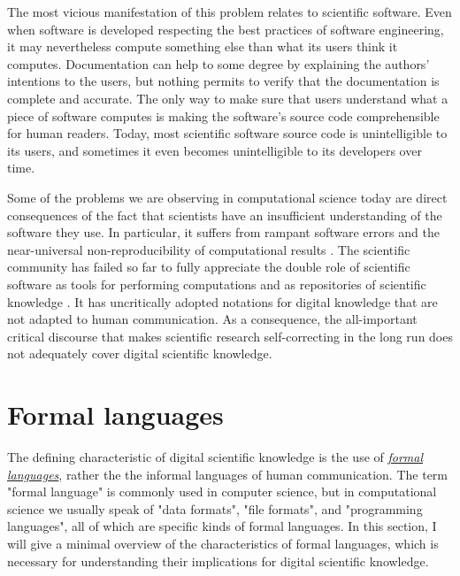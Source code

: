 The most vicious manifestation of this problem relates to scientific software. Even when software is developed respecting the best practices of software engineering, it may nevertheless compute something else than what its users think it computes. Documentation can help to some degree by explaining the authors' intentions to the users, but nothing permits to verify that the documentation is complete and accurate. The only way to make sure that users understand what a piece of software computes is making the software's source code comprehensible for human readers. Today, most scientific software source code is unintelligible to its users, and sometimes it even becomes unintelligible to its developers over time.

Some of the problems we are observing in computational science today are direct consequences of the fact that scientists have an insufficient understanding of the software they use. In particular, it suffers from rampant software errors \cite{soergel_rampant_2014,merali_computational_2010} and the near-universal non-reproducibility of computational results \cite{stodden_setting_2013,peng_reproducible_2011}. The scientific community has failed so far to fully appreciate the double role of scientific software as tools for performing computations and as repositories of scientific knowledge \cite{hinsen_computational_2014}. It has uncritically adopted notations for digital knowledge that are not adapted to human communication. As a consequence, the all-important critical discourse that makes scientific research self-correcting in the long run does not adequately cover digital scientific knowledge.

\section{Formal languages}
\label{formal-languages}

The defining characteristic of digital scientific knowledge is the use of \href{http://en.wikipedia.org/wiki/Template:Formal_languages_and_grammars}{\textit{formal languages}}, rather the the informal languages of human communication. The term "formal language" is commonly used in computer science, but in computational science we usually speak of "data formats", "file formats", and "programming languages", all of which are specific kinds of formal languages. In this section, I will give a minimal overview of the characteristics of formal languages, which is necessary for understanding their implications for digital scientific knowledge.

